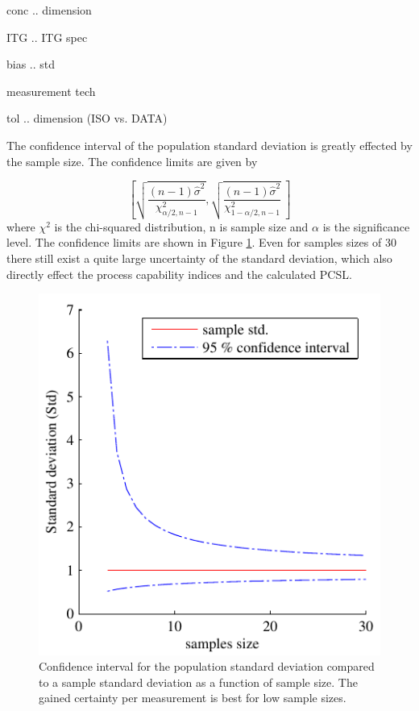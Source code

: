\documentclass[]{article}
\begin{document}
conc .. dimension

ITG .. ITG spec

bias .. std

measurement tech

tol .. dimension (ISO vs. DATA)







The confidence interval of the population standard deviation is greatly effected by the sample size.  The confidence limits are given by

\begin{equation}
\left[ \sqrt{\frac{(n-1) \hat{\sigma}^2 }{\chi^2_{\alpha/2,n-1}}},  \sqrt{\frac{(n-1) \hat{\sigma}^2 }{\chi^2_{1-\alpha/2,n-1}}} \  \right]
\end{equation}
where $\chi^2$ is the chi-squared distribution, n is sample size and $\alpha$ is the significance level. The confidence limits are shown in Figure \ref{fig:std_uncertainty}. Even for samples sizes of 30 there still exist a quite large uncertainty of the standard deviation, which also directly effect the process capability indices and the calculated PCSL. 

\begin{figure}
\includegraphics{stats_std_confidence.pdf}
\caption{\label{fig:std_uncertainty}Confidence interval for the population standard deviation compared to a sample standard deviation as a function of sample size. The gained certainty per measurement is best for low sample sizes.}
\end{figure}
\end{document}
